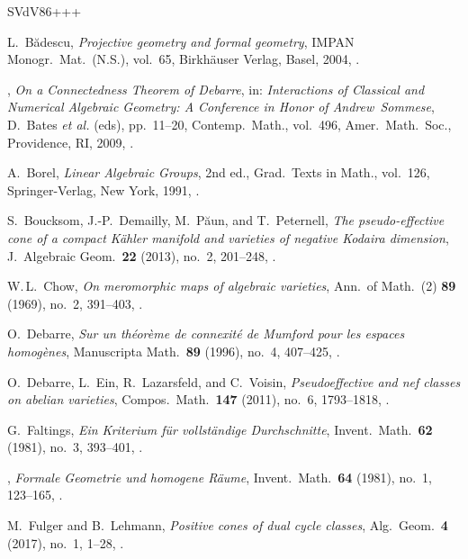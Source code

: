 \newcommand{\etalchar}[1]{$^{#1}$}
\begin{thebibliography}{SVdV86+++}

L.~B\u{a}descu, \emph{Projective geometry and formal geometry}, IMPAN Monogr.\ Mat.\ (N.S.), vol.~65, Birkh\"auser Verlag, Basel, 2004, .

\bysame,  \emph{On a Connectedness Theorem of Debarre}, in: \emph{Interactions of Classical and Numerical Algebraic Geometry: A Conference in Honor of Andrew~Sommese}, D.~Bates \emph{et al.} (eds), pp.~11--20, Contemp.\ Math., vol.~496, Amer.\ Math.\ Soc., Providence, RI, 2009, .

A.~Borel, \emph{Linear Algebraic Groups}, 2nd ed., Grad.\  Texts in Math., vol.~126, Springer-Verlag, New York, 1991, .

\bibitem[BDP\etalchar{+}13]{bdpp}
S.~Boucksom, J.-P.~Demailly, M.~P\u{a}un, and T.~Peternell, \emph{The pseudo-effective cone of a compact K\"ahler manifold and varieties of negative Kodaira dimension}, J.~Algebraic Geom.\ \textbf{22} (2013), no.~2, 201--248, .

W.\,L.~Chow, \emph{On meromorphic maps of algebraic varieties}, Ann.\ of Math.~(2) \textbf{89} (1969), no.~2, 391--403, .

O.~Debarre,  \emph{Sur un th\'eor\`eme de connexit\'e de Mumford pour les espaces homog\`enes}, Manuscripta Math.\ \textbf{89} (1996), no.~4, 407--425, .

\bibitem[DEL\etalchar{+}11]{delv}
 O.~Debarre, L.~Ein, R.~Lazarsfeld, and C.~Voisin, \emph{Pseudoeffective and nef classes on abelian varieties}, Compos.\ Math.\ \textbf{147} (2011), no.~6, 1793--1818, .

G.~Faltings, \emph{Ein Kriterium f\"ur vollst\"andige Durchschnitte}, Invent.\ Math.\ \textbf{62} (1981),  no.~3, 393--401, .

  \bysame,  \emph{Formale Geometrie und homogene R\"aume}, Invent.\ Math.\ \textbf{64} (1981), no.~1, 123--165, .

M.~Fulger and B.~Lehmann,  \emph{Positive cones of dual cycle classes}, Alg.\ Geom.\ \textbf{4} (2017), no.~1, 1--28, .


\end{thebibliography}
